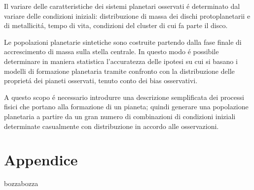 \documentclass[twoside,11pt,fleqn]{memoir}%
\def\versione{bozza}%
\def\bozza{bozza}
\begin{document}
\begin{errata}
Il variare delle caratteristiche dei sistemi planetari osservati \'e determinato dal variare delle condizioni iniziali: distribuzione di massa dei dischi protoplanetarii e di metallicit\'a, tempo di vita, condizioni del cluster di cui fa parte il disco.
\end{errata}

Le popolazioni planetarie sintetiche sono costruite partendo dalla fase finale di accrescimento di massa sulla stella centrale. In questo modo \'e possibile determinare in maniera statistica l'accuratezza delle ipotesi su cui si basano i modelli di formazione planetaria tramite confronto con la distribuzione delle propriet\'a dei pianeti osservati, tenuto conto dei bias osservativi.

A questo scopo  \'e necessario introdurre una descrizione semplificata dei processi fisici che portano alla formazione di un pianeta; quindi generare una popolazione planetaria a partire da un gran numero di combinazioni di condizioni iniziali determinate casualmente con distribuzione in accordo alle osservazioni.


\cleartorecto



{\let\clearpage\relax\let\cleardoublepage\relax
\backmatter
}

\appendix
\part{Appendice}

\printbibliography
\ifx\versione\bozza
\woc
\erratac
\fi
\end{document}
